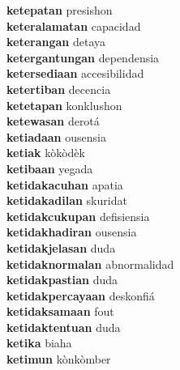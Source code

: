 \textbf{ketepatan } presishon \\
\textbf{keteralamatan } capacidad \\
\textbf{keterangan } detaya \\
\textbf{ketergantungan } dependensia \\
\textbf{ketersediaan } accesibilidad \\
\textbf{ketertiban } decencia \\
\textbf{ketetapan } konklushon \\
\textbf{ketewasan } derotá \\
\textbf{ketiadaan } ousensia \\
\textbf{ketiak } kòkòdèk \\
\textbf{ketibaan } yegada \\
\textbf{ketidakacuhan } apatia \\
\textbf{ketidakadilan } skuridat \\
\textbf{ketidakcukupan } defisiensia \\
\textbf{ketidakhadiran } ousensia \\
\textbf{ketidakjelasan } duda \\
\textbf{ketidaknormalan } abnormalidad \\
\textbf{ketidakpastian } duda \\
\textbf{ketidakpercayaan } deskonfiá \\
\textbf{ketidaksamaan } fout \\
\textbf{ketidaktentuan } duda \\
\textbf{ketika } biaha \\
\textbf{ketimun } kònkòmber \\
